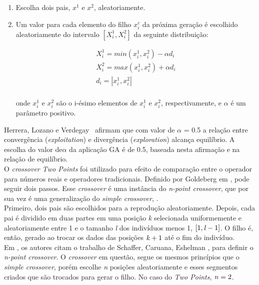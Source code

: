 \begin{enumerate}
  \item Escolha dois pais, $x^1$ e $x^2$, aleatoriamente.
  \item Um valor para cada elemento do filho $x^c_i$ da próxima geração é escolhido aleatoriamente do intervalo $[X^1_i, X^2_i]$ da seguinte distribuição:
\begin{center}
	\begin{equation}
	\begin{split}
		X^1_i = min(x^1_i,x^2_i) - \alpha d_i		\\
		X^2_i = max(x^1_i,x^2_i) + \alpha d_i 		\\
d_i = |x^1_i,x^2_i| \\
	\end{split}
	\end{equation}
\end{center}
onde $x^1_i$ e $x^2_i$ são o i-ésimo elementos de $x^1_i$ e $x^2_i$, respectivamente, e $\alpha$ é um parâmetro positivo.
\end{enumerate}

Herrera, Lozano e Verdegay~\cite{herrera1998tackling} afirmam que com valor de $\alpha$ = 0.5 a relação entre convergência ({\it exploitation}) e divergência ({\it exploration}) alcança equilíbrio. A escolha do valor de$\alpha$ da aplicação GA é de 0.5, baseada nesta afirmação e na relação de equilíbrio.\\

O {\it crossover Two Points} foi utilizado para efeito de comparação entre o operador para números reais e operadores tradicionais. Definido por Goldeberg em \cite{Goldberg:1989:GAS:534133}, pode seguir dois passos. Esse {\it crossover} é uma instância do {\it n-point crossover}, que por sua vez é uma generalização do {\it simple crossover}, \cite{herrera1998tackling}.\\

Primeiro, dois pais são escolhidos para a reprodução aleatoriamente. Depois, cada pai é dividido em duas partes em uma posição {\it k} selecionada uniformemente e aleatoriamente entre 1 e o tamanho {\it l} dos indivíduos menos 1, $[1, {\it l} -1]$. O filho é, então, gerado ao trocar os dados das posições ${\it k} + 1$ até o fim do indivíduo.\\

Em \cite{herrera1998tackling}, os autores citam o trabalho de Schaffer, Caruana, Eshelman \cite{schaffer1989study}, para definir o {\it n-point crossover}. O {\it crossover} em questão, segue os mesmos princípios que o {\it simple crossover}, porém escolhe {\it n} posições aleatoriamente e esses segmentos criados que são trocados para gerar o filho. No caso do {\it Two Points}, ${\it n} = 2$.

